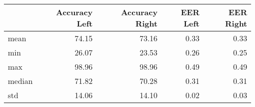 \begin{tabular}{lrrrr}
\toprule
{} &  Accuracy Left &  Accuracy Right &  EER Left &  EER Right \\
\midrule
mean   &          74.15 &           73.16 &      0.33 &       0.33 \\
min    &          26.07 &           23.53 &      0.26 &       0.25 \\
max    &          98.96 &           98.96 &      0.49 &       0.49 \\
median &          71.82 &           70.28 &      0.31 &       0.31 \\
std    &          14.06 &           14.10 &      0.02 &       0.03 \\
\bottomrule
\end{tabular}
